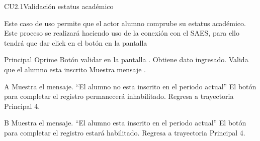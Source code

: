 \begin{UseCase}{CU2.1}{Validación estatus académico}{
		\noindent Este caso de uso permite que el actor alumno comprube su estatus académico. Este proceso se realizará haciendo uso de la conexión con el SAES, para ello tendrá que dar click en el botón  en la pantalla  
		
	}\label{CU3_Validacionestatusacademico}
\end{UseCase}
\begin{UCtrayectoria}{Principal}
	\UCpaso[\UCactor] Oprime Botón validar en la pantalla .
	\UCpaso Obtiene dato ingresado.
	\UCpaso Valida que el alumno esta inscrito 
	\UCpaso Muestra mensaje .  
\end{UCtrayectoria}

\begin{UCtrayectoriaA}{A}{}
	\UCpaso Muestra el mensaje. “El alumno no esta inscrito en el periodo actual”
	\UCpaso El botón para completar el registro permanecerá inhabilitado.
	\UCpaso Regresa a trayectoria Principal 4.
\end{UCtrayectoriaA}

\begin{UCtrayectoriaA}{B}{}
	\UCpaso Muestra el mensaje. “El alumno esta inscrito en el periodo actual”
	\UCpaso El botón para completar el registro estará habilitado.
	\UCpaso Regresa a trayectoria Principal 4.
\end{UCtrayectoriaA}